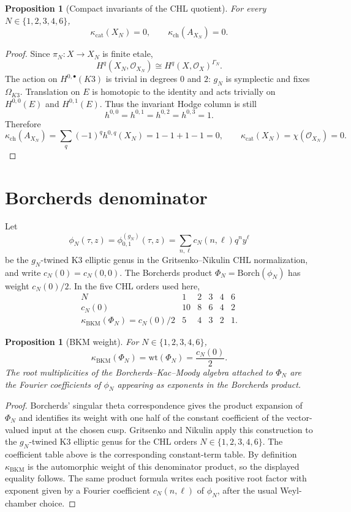 \documentclass[11pt]{amsart}
\providecommand{\cO}{\mathcal{O}}
\providecommand{\kch}{\kappa_{\mathrm{ch}}}
\providecommand{\kBKM}{\kappa_{\mathrm{BKM}}}
\providecommand{\kcat}{\kappa_{\mathrm{cat}}}
\theoremstyle{plain}
\newtheorem{proposition}[theorem]{Proposition}
\theoremstyle{definition}
\theoremstyle{remark}
\begin{document}
\begin{proposition}[Compact invariants of the CHL quotient]\label{prop:chl-hodge-invariants}
For every $N\in\{1,2,3,4,6\}$,
\[
 \kcat(X_N)=0,\qquad
 \kch(A_{X_N})=0.
\]
\end{proposition}

\begin{proof}
Since $\pi_N:X\to X_N$ is finite etale,
\[
 H^q(X_N,\cO_{X_N})
 \cong H^q(X,\cO_X)^{\Gamma_N}.
\]
The action on $H^{0,\bullet}(K3)$ is trivial in degrees $0$ and $2$:
$g_N$ is symplectic and fixes $\Omega_{K3}$. Translation on $E$ is
homotopic to the identity and acts trivially on $H^{0,0}(E)$ and
$H^{0,1}(E)$. Thus the invariant Hodge column is still
\[
 h^{0,0}=h^{0,1}=h^{0,2}=h^{0,3}=1.
\]
Therefore
\[
 \kch(A_{X_N})=\sum_q(-1)^q h^{0,q}(X_N)=1-1+1-1=0,
 \qquad
 \kcat(X_N)=\chi(\cO_{X_N})=0.
\]
\end{proof}

\section{Borcherds denominator}

Let
\[
 \phi_N(\tau,z)=\phi_{0,1}^{(g_N)}(\tau,z)
 =\sum_{n,\ell}c_N(n,\ell)q^n y^\ell
\]
be the $g_N$-twined K3 elliptic genus in the Gritsenko--Nikulin CHL
normalization, and write $c_N(0)=c_N(0,0)$. The Borcherds product
$\Phi_N=\mathrm{Borch}(\phi_N)$ has weight $c_N(0)/2$. In the five CHL
orders used here,
\[
\begin{array}{c|ccccc}
N&1&2&3&4&6\\ \hline
c_N(0)&10&8&6&4&2\\
\kBKM(\Phi_N)=c_N(0)/2&5&4&3&2&1 .
\end{array}
\]

\begin{proposition}[BKM weight]\label{prop:bkm-weight}
For $N\in\{1,2,3,4,6\}$,
\[
 \kBKM(\Phi_N)=\mathrm{wt}(\Phi_N)=\frac{c_N(0)}{2}.
\]
The root multiplicities of the Borcherds--Kac--Moody algebra attached
to $\Phi_N$ are the Fourier coefficients of $\phi_N$ appearing as
exponents in the Borcherds product.
\end{proposition}

\begin{proof}
Borcherds' singular theta correspondence gives the product expansion
of $\Phi_N$ and identifies its weight with one half of the constant
coefficient of the vector-valued input at the chosen cusp. Gritsenko
and Nikulin apply this construction to the $g_N$-twined K3 elliptic
genus for the CHL orders $N\in\{1,2,3,4,6\}$. The coefficient table
above is the corresponding constant-term table. By definition
$\kBKM$ is the automorphic weight of this denominator product, so
the displayed equality follows. The same product formula writes each
positive root factor with exponent given by a Fourier coefficient
$c_N(n,\ell)$ of $\phi_N$, after the usual Weyl-chamber choice.
\end{proof}
\end{document}
